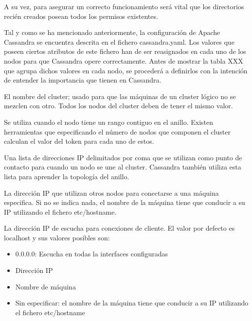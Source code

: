 

A su vez, para asegurar un correcto funcionamiento será vital que los directorios recién creados posean todos los permisos existentes. 

Tal y como se ha mencionado anteriormente, la configuración de Apache Cassandra se encuentra descrita en el fichero cassandra.yaml. Los valores que poseen ciertos atributos de este fichero han de ser reasignados en cada uno de los nodos para que Cassandra opere correctamente. Antes de mostrar la tabla XXX que agrupa dichos valores en cada nodo, se procederá a definirlos con la intención de entender la importancia que tienen en Cassandra.


El nombre del cluster; usado para que las máquinas de un cluster lógico no se mezclen con otro. Todos los nodos del cluster deben de tener el mismo valor.


Se utiliza cuando el nodo tiene un rango contiguo en el anillo. Existen herramientas que especificando el número de nodos que componen el cluster calculan el valor del token para cada uno de estos.


Una lista de direcciones IP delimitados por coma que se utilizan como punto de contacto para cuando un nodo se une al cluster. Cassandra también utiliza esta lista para aprender la topología del anillo.


La dirección IP que utilizan otros nodos para conectarse a una máquina especifica. Si no se indica nada, el nombre de la máquina tiene que conducir a su IP utilizando el fichero etc/hostname.


La dirección IP de escucha para conexiones de cliente. El valor por defecto es localhost y sus valores posibles son:

\begin{itemize}
	\item 0.0.0.0: Escucha en todas la interfaces configuradas
	\item Dirección IP
	\item Nombre de máquina
	\item Sin especificar: el nombre de la máquina tiene que conducir a su IP utilizando el fichero etc/hostname
\end{itemize}
	
